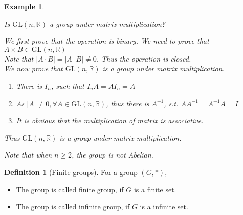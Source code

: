 \documentclass{article}
\theoremstyle{MyNonumberplain}
\theoremstyle{break}
\theoremstyle{break}
\newtheorem{example}{Example}[section]
\theoremstyle{break}
\theoremstyle{definition}
\theoremstyle{break}
\newtheorem{definition}{Definition}[section]
\begin{document}
\begin{expbox}
    \begin{example}
        \begin{example*}
            Is $\text{GL} (n, \mathbb{R})$ a group under matrix multiplication?
            \begin{ansbox}
                We first prove that the operation is binary. We need to prove that $A \times
                B \in \text{GL} (n, \mathbb{R})$\\
                
                Note that $| A \cdot B | = | A | | B | \neq 0$. Thus the operation is closed.\\
                
                We now prove that $\text{GL} (n, \mathbb{R})$ is a group under matrix
                multiplication.\\
                \begin{enumerate}
                  \item There is $I_n$, such that $I_n A = A I_n = A$\\
                  
                  \item As $| A | \neq 0, \forall A \in \text{GL} (n, \mathbb{R})$, thus
                  there is $A^{- 1}$, s.t. $A A^{- 1} = A^{- 1} A = I$\\
                  
                  \item It is obvious that the multiplication of matrix is associative.\\
                \end{enumerate}
                Thus $\text{GL} (n, \mathbb{R})$ is a group under matrix multiplication.\\    
            \end{ansbox}
            Note that when $n \geq 2$, the group is not Abelian.
          \end{example*}
    \end{example}
\end{expbox}

\begin{defbox}
    \begin{definition}[Finite groups]
        For a group $(G, \ast)$,\\
        \begin{itemize}
            \item The group is called finite group, if $G$ is a finite set.
            
            \item The group is called infinite group, if $G$ is a infinite set.
        \end{itemize}
    \end{definition}
\end{defbox}
\end{document}
